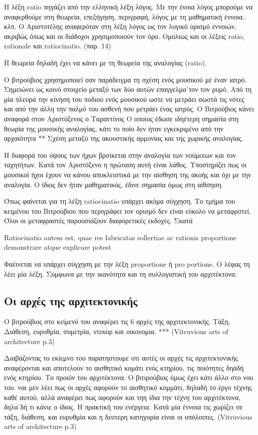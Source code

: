 Η λέξη ratio πηγάζει από την ελληνική λέξη λόγος. Με την ένοια λόγος μπορούμε
να αναφερθούμε στη θεωρεία, επεξήγηση, περιγραφή, λόγος με τη μαθηματική
έννοια.. κλπ. Ο Αριστοτέλης αναφερόταν στη λέξη λόγος ως τον λογικό ορισμό
εννοιών, ακριβώς όπως και οι διάδοχοι χρησιμοποιούν τον όρο. Ομολιως και οι
λέξεις ratio, rationale και ratiocinatio. (παρ. 14)

Η θεωρεία δηλαδή έχει να κάνει με τη θεωρεία της αναλογίας (ratio). 

Ο βιτρούβιος χρησημοποιεί σαν παράδειγμα τη σχέση ενός μουσικού μέ έναν ιατρό.
Σημειώνει ως κοινό στοιχείο μεταξύ των δύο αυτών επαγγελμα΄τον τον ρυμό. Από τη
μία πλευρά την κίνηση του ποδιού ενός μουσικού ωστε να μετράει σωστά τις νότες
και από την άλλη την παλμό του ασθενή που μετράει ένας ιατρός. Ο Βιτρούβιος
κάνει αναφορά στον Αριστόξενος ο Ταραντίνος Ο οποίος έδωσε ιδηέτερη σημασία στη
θεωρία της μουσικής αναλογίας, κάτι το ποίο δεν ήταν εγκεκριμένο από την
αρχαιότητα ** Σχέση μεταξύ της ακουστικής αρμονίας και της χωρικής αναλογίας. 

Η διαφορά του ύψους των ήχων βρσίκεται στην αναλογία των νούμεεων και τον
ταχητήτων. Κατά τον Αριστόξενο η πρώταση αυτή είναι λάθος. Υποστηρίζει πως οι
μουσικοί ήχοι έχουν να κάνου αποκλειστικά με την αίσθηση της ακοής και όχι με
την αναλογία. Ο ίδιος δεν ήταν μαθηματικός, έδινε σημασία όμως στη αίθσηση. 

Όπως φαίνεται για τη λέξη ratiocinatio υπάρχει ακόμα σύγχηση. Το τμήμα του
κειμένου του Βιτρούβιου που περιγράφει τον ορισμό δεν είναι εύκολο να
μεταφρστεί. Όλοι οι μεταφραστές παρουσιάζουν διαφορετικές εκδοχές. Σκατά

Ratiocinatio autem est, quae res fabricatas sollertiae ac rationis proportione
demonstrare atque explicare potest

Φαέινεται να υπάρχει σύγχηση με την λέξη proportione ή pro portione. Ο λέφας
τη λέει μία λέξη. 
Σύμφωνα με την ικανότητα και τη συλλογιστική του αρχιτέκτονα.

\subsection{Οι αρχές της αρχιτεκτονικής}

Ο βιτρούβιος στο κείμενό του αναφέρει τις 6 αρχές της αρχιτεκτονικής. Τάξη,
Διάθεση, ευρυθμία, συμετρία, ντεκορ και οικονομια. *** (Vitruvious arts of
architecture p.3)

Διαβάζοντας το εκίεμνο του παρατηστουμε οτι αυτές οι αρχές τις αρχιτεκτονικής
αναφέρονται και αποτελούν το αισθητικό κομάτι ενός κτηρίου, τις ποιότητες δηάδή
ενός κτηρίου. Το προιόν του αρχιτέκτονα. Ο βιτιρούβιος όμως έχει κάτι άλλο στο
νου του. ναι μεν λέει πως οι αρχές αφορούν το αισθητικό κομμάτι, δηλαδή το έργο
τέχνης καθέ αυτού, αλλά αναφέρει πως αφορούν και τηη ίδια την τέχνη του
αρχιτέκτονα, δηλα΄δή τι κάνιε ο ίδιος. Η πρακτική του ενέργεια. Κατά μία έννοια
τις χωρίζει σε τάξη, διάθεση, και ευρυθμία και η δευτερη κατηγορία είναι οι
υπόλοιπες. (Vitruvious arts of architecture p.3)

